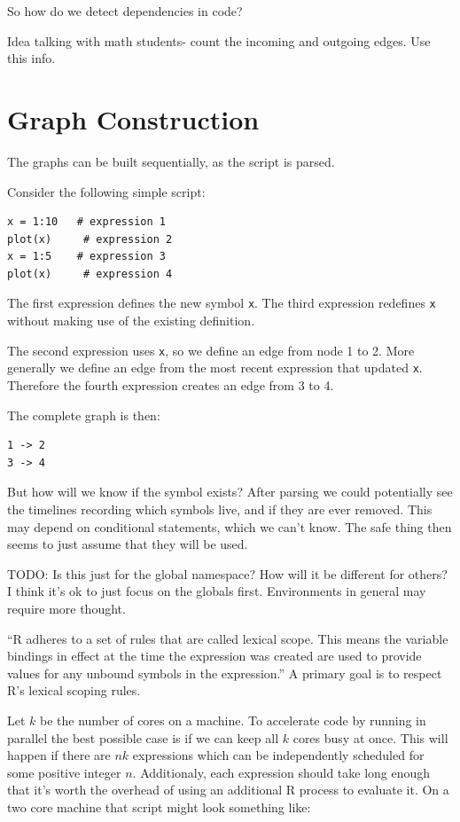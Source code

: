 \documentclass[12pt]{article}
\begin{document}
So how do we detect dependencies in code?

Idea talking with math students- count the incoming and outgoing edges. Use
this info.


\section{Graph Construction}

The graphs can be built sequentially, as the script is parsed.

Consider the following simple script:

\begin{verbatim}
x = 1:10   # expression 1
plot(x)     # expression 2
x = 1:5    # expression 3
plot(x)     # expression 4
\end{verbatim}

The first expression defines the new symbol \texttt{x}. The third
expression redefines \texttt{x} without making use of the existing
definition.

The second expression uses \texttt{x}, so we define an edge from node 1 to 2.
More generally we define an edge from the most recent expression that
updated \texttt{x}. Therefore the fourth expression creates an edge from 3
to 4.

The complete graph is then:

\begin{verbatim}
1 -> 2
3 -> 4
\end{verbatim}

But how will we know if the symbol exists? After parsing we could
potentially see the timelines recording which symbols live, and if they are
ever removed. This may depend on conditional statements, which we can't
know. The safe thing then seems to just assume that they will be used.

TODO: Is this just for the global namespace? How will it be different for
others? I think it's ok to just focus on the globals first. Environments in
general may require more thought.

``R adheres to a set of rules that are called lexical scope. This means the
variable bindings in effect at the time the expression was created are used
to provide values for any unbound symbols in the expression.''
\cite{Rlang} A primary goal is to respect R's lexical scoping rules.

Let $k$ be the number of cores on a machine.
To accelerate code by running in parallel the best possible case is if
we can keep all $k$ cores busy at once. This will happen if there are $nk$
expressions which can be independently scheduled for some positive integer
$n$. Additionaly, each expression should take long enough that
it's worth the overhead of using an additional R process to evaluate it.
On a two core machine that script might look something like:
\end{document}
